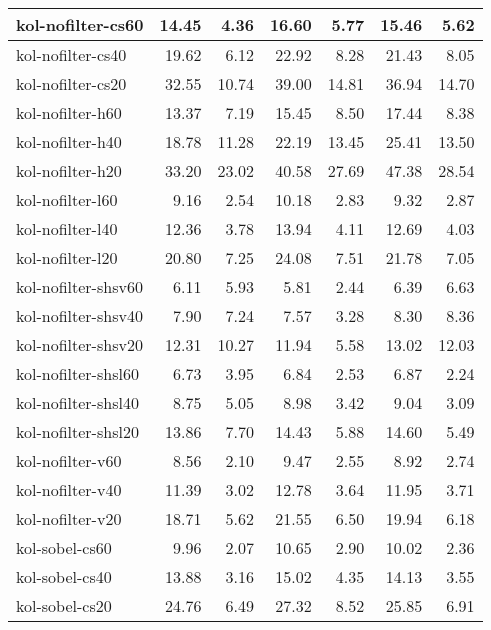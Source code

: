 \begin{tabular}{lrrrrrr}
\toprule
kol-nofilter-cs60   &   14.45 &    4.36 &   16.60 &    5.77 &   15.46 &    5.62 \\
\midrule
kol-nofilter-cs40   &   19.62 &    6.12 &   22.92 &    8.28 &   21.43 &    8.05 \\
kol-nofilter-cs20   &   32.55 &   10.74 &   39.00 &   14.81 &   36.94 &   14.70 \\
kol-nofilter-h60    &   13.37 &    7.19 &   15.45 &    8.50 &   17.44 &    8.38 \\
kol-nofilter-h40    &   18.78 &   11.28 &   22.19 &   13.45 &   25.41 &   13.50 \\
kol-nofilter-h20    &   33.20 &   23.02 &   40.58 &   27.69 &   47.38 &   28.54 \\
kol-nofilter-l60    &    9.16 &    2.54 &   10.18 &    2.83 &    9.32 &    2.87 \\
kol-nofilter-l40    &   12.36 &    3.78 &   13.94 &    4.11 &   12.69 &    4.03 \\
kol-nofilter-l20    &   20.80 &    7.25 &   24.08 &    7.51 &   21.78 &    7.05 \\
kol-nofilter-shsv60 &    6.11 &    5.93 &    5.81 &    2.44 &    6.39 &    6.63 \\
kol-nofilter-shsv40 &    7.90 &    7.24 &    7.57 &    3.28 &    8.30 &    8.36 \\
kol-nofilter-shsv20 &   12.31 &   10.27 &   11.94 &    5.58 &   13.02 &   12.03 \\
kol-nofilter-shsl60 &    6.73 &    3.95 &    6.84 &    2.53 &    6.87 &    2.24 \\
kol-nofilter-shsl40 &    8.75 &    5.05 &    8.98 &    3.42 &    9.04 &    3.09 \\
kol-nofilter-shsl20 &   13.86 &    7.70 &   14.43 &    5.88 &   14.60 &    5.49 \\
kol-nofilter-v60    &    8.56 &    2.10 &    9.47 &    2.55 &    8.92 &    2.74 \\
kol-nofilter-v40    &   11.39 &    3.02 &   12.78 &    3.64 &   11.95 &    3.71 \\
kol-nofilter-v20    &   18.71 &    5.62 &   21.55 &    6.50 &   19.94 &    6.18 \\
kol-sobel-cs60      &    9.96 &    2.07 &   10.65 &    2.90 &   10.02 &    2.36 \\
kol-sobel-cs40      &   13.88 &    3.16 &   15.02 &    4.35 &   14.13 &    3.55 \\
kol-sobel-cs20      &   24.76 &    6.49 &   27.32 &    8.52 &   25.85 &    6.91 \\

\end{tabular}
